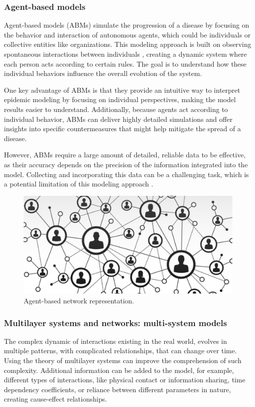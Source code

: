 \subsubsection{Agent-based models}
Agent-based models (ABMs) simulate the progression of a disease by focusing on the behavior and interaction of autonomous agents, which could be individuals or collective entities like organizations. This modeling approach is built on observing spontaneous interactions between individuals \cite{Tizzoni2014}, creating a dynamic system where each person acts according to certain rules. The goal is to understand how these individual behaviors influence the overall evolution of the system.

One key advantage of ABMs is that they provide an intuitive way to interpret epidemic modeling by focusing on individual perspectives, making the model results easier to understand. Additionally, because agents act according to individual behavior, ABMs can deliver highly detailed simulations and offer insights into specific countermeasures that might help mitigate the spread of a disease.

However, ABMs require a large amount of detailed, reliable data to be effective, as their accuracy depends on the precision of the information integrated into the model. Collecting and incorporating this data can be a challenging task, which is a potential limitation of this modeling approach \cite{Hernandez_Vargas_2022}.
\begin{figure}
	\centering
	\includegraphics[width=0.5\linewidth]{0_introduction/images_introduction/agent_based}
	\caption[Agent-based network representation]{Agent-based network representation.}
	\label{fig:agentbased}
\end{figure}

\subsubsection{Multilayer systems and networks: multi-system models}
\label{subsec:multisystem_models} 
The complex dynamic of interactions existing in the real world, evolves in multiple patterns, with complicated relationships, that can change over time. Using the theory of multilayer systems can improve the comprehension of such complexity. Additional information can be added to the model, for example, different types of interactions, like physical contact or information sharing, time dependency coefficients, or reliance between different parameters in nature, creating cause-effect relationships.


